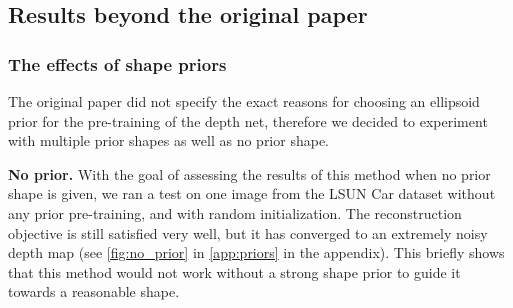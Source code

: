 \subsection{Results beyond the original paper}
\subsubsection{The effects of shape priors}
\label{sec:results_priors}
The original paper did not specify the exact reasons for choosing an ellipsoid prior for the pre-training of the depth net, therefore we decided to experiment with multiple prior shapes as well as no prior shape.

\textbf{No prior.} With the goal of assessing the results of this method when no prior shape is given, we ran a test on one image from the LSUN Car dataset without any prior pre-training, and with random initialization. The reconstruction objective is still satisfied very well, but it has converged to an extremely noisy depth map (see \autoref{fig:no_prior} in \autoref{app:priors} in the appendix). This briefly shows that this method would not work without a strong shape prior to guide it towards a reasonable shape.


